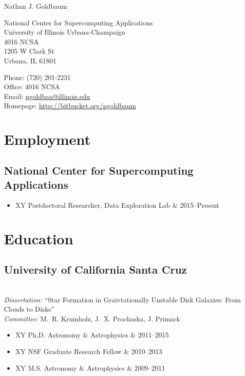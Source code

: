 \documentclass[10pt,letterpaper]{article}
\def\name{Nathan J. Goldbaum}
\newcommand{\textline}[2]{
  \begin{tabularx}{\textwidth}{XY}
  #1 & #2
  \end{tabularx}
}
\begin{document}
{\huge \name}


\bigskip

\begin{minipage}[t]{0.6\textwidth}
  National Center for Supercomputing Applications \\
  University of Illinois Urbana-Champaign \\
  4016 NCSA \\
  1205 W Clark St \\
  Urbana, IL 61801
\end{minipage}
\begin{minipage}[t]{0.4\textwidth}
  Phone: (720) 201-2231 \\
  Office: 4016 NCSA \\
  Email: \href{mailto:ngoldbau@illinois.edu}{ngoldbau@illinois.edu} \\
  Homepage: \href{https://bitbucket.org/ngoldbaum}{http://bitbucket.org/ngoldbaum}
\end{minipage}

\section*{Employment}

\subsection*{National Center for Supercomputing Applications}
  \begin{itemize}
    \item[] \textline{Postdoctoral Researcher, Data Exploration Lab}{2015--Present}
  \end{itemize}

\section*{Education}

\subsection*{University of California Santa Cruz} \\
\emph{Dissertation:} ``Star Formation in Graivtationally Unstable Disk
Galaxies: From Clouds to Disks''\\
\emph{Committee:} M.~R. Krumholz, J.~X. Prochaska, J. Primack
\begin{itemize}
\item[] \textline{Ph.D. Astronomy \& Astrophysics}{2011--2015}
\item[] \textline{NSF Graduate Research Fellow}{2010--2013}
\item[] \textline{M.S. Astronomy \& Astrophysics}{2009--2011}
\end{itemize}
\end{document}
